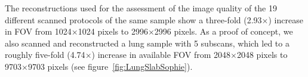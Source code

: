 The reconstructions used for the assessment of the image quality of the 19 different scanned protocols of the same sample show a three-fold (2.93\(\times\)) increase in FOV from 1024\(\times\)1024 pixels to 2996\(\times\)2996 pixels. As a proof of concept, we also scanned and reconstructed a lung sample with 5 subscans, which led to a roughly five-fold (4.74\(\times\)) increase in available FOV from 2048\(\times\)2048 pixels to 9703\(\times\)9703 pixels (see figure~\ref{fig:LungSlabSophie}).